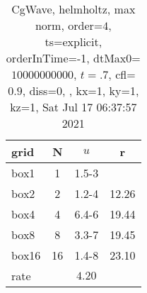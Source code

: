 \begin{table}[H]\tableFont %
\begin{center}
\begin{tabular}{|l|c|c|c|} \hline 
grid  & N &  $ u $ & r \\ \hline 
      box1 &     1 & \num{1.5}{-3} &        \\ \hline
      box2 &     2 & \num{1.2}{-4} & 12.26  \\ \hline
      box4 &     4 & \num{6.4}{-6} & 19.44  \\ \hline
      box8 &     8 & \num{3.3}{-7} & 19.45  \\ \hline
     box16 &    16 & \num{1.4}{-8} & 23.10  \\ \hline
    rate             &       &  $4.20$       &       \\ \hline
\end{tabular}
\caption{CgWave, helmholtz, max norm, order=$4$, ts=explicit, orderInTime=-1, dtMax0=$10000000000$, $t=.7$, cfl=$0.9$, diss=$0$, , kx=1, ky=1, kz=1, Sat Jul 17 06:37:57 2021}\label{table:helmholtzOrder4max}
\end{center}
\end{table}
